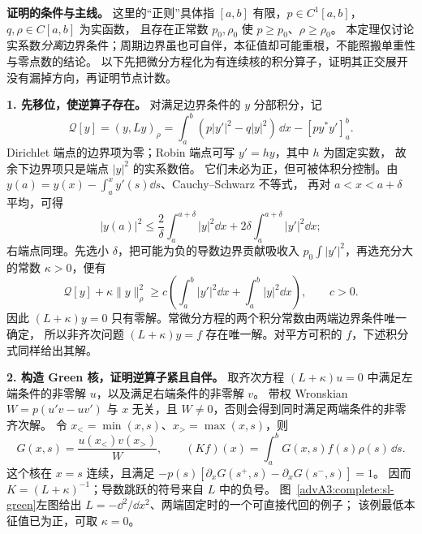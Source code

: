 \noindent\textbf{证明的条件与主线。}
这里的“正则”具体指 $[a,b]$ 有限，$p\in C^1[a,b]$，$q,\rho\in C[a,b]$ 为实函数，
且存在正常数 $p_0,\rho_0$ 使 $p\ge p_0$、$\rho\ge\rho_0$。
本定理仅讨论实系数\emph{分离}边界条件；周期边界虽也可自伴，本征值却可能重根，不能照搬单重性与零点数的结论。
以下先把微分方程化为有连续核的积分算子，证明其正交展开没有漏掉方向，再证明节点计数。

\textbf{1. 先移位，使逆算子存在。}
对满足边界条件的 $y$ 分部积分，记
\[
 \mathcal Q[y]=(y,Ly)_\rho
 =\int_a^b(p|y'|^2-q|y|^2)\,\dd x-[py^*y']_a^b.
\]
Dirichlet 端点的边界项为零；Robin 端点可写 $y'=h y$，其中 $h$ 为固定实数，
故余下边界项只是端点 $|y|^2$ 的实系数倍。
它们未必为正，但可被体积分控制。由 $y(a)=y(x)-\int_a^xy'(s)\dd s$、Cauchy--Schwarz 不等式，
再对 $a<x<a+\delta$ 平均，可得
\[
 |y(a)|^2\le\frac2\delta\int_a^{a+\delta}|y|^2\dd x
             +2\delta\int_a^{a+\delta}|y'|^2\dd x;
\]
右端点同理。先选小 $\delta$，把可能为负的导数边界贡献吸收入 $p_0\int|y'|^2$，再选充分大的常数 $\kappa>0$，便有
\[
 \mathcal Q[y]+\kappa\|y\|_\rho^2
 \ge c\left(\int_a^b|y'|^2\dd x+\int_a^b|y|^2\dd x\right),\qquad c>0.
\]
因此 $(L+\kappa)y=0$ 只有零解。常微分方程的两个积分常数由两端边界条件唯一确定，
所以非齐次问题 $(L+\kappa)y=f$ 存在唯一解。对平方可积的 $f$，下述积分式同样给出其解。

\textbf{2. 构造 Green 核，证明逆算子紧且自伴。}
取齐次方程 $(L+\kappa)u=0$ 中满足左端条件的非零解 $u$，以及满足右端条件的非零解 $v$。
带权 Wronskian
$W=p(u'v-uv')$ 与 $x$ 无关，且 $W\ne0$，否则会得到同时满足两端条件的非零齐次解。
令 $x_<=\min(x,s)$、$x_>=\max(x,s)$，则
\[
 G(x,s)=\frac{u(x_<)v(x_>)}W,\qquad
 (Kf)(x)=\int_a^bG(x,s)f(s)\rho(s)\,\dd s.
\]
这个核在 $x=s$ 连续，且满足
$-p(s)[\partial_xG(s^+,s)-\partial_xG(s^-,s)]=1$。
因而 $K=(L+\kappa)^{-1}$；导数跳跃的符号来自 $L$ 中的负号。
图~\ref{advA3:complete:sl-green}左图给出 $L=-\dd^2/\dd x^2$、两端固定时的一个可直接代回的例子；
该例最低本征值已为正，可取 $\kappa=0$。

